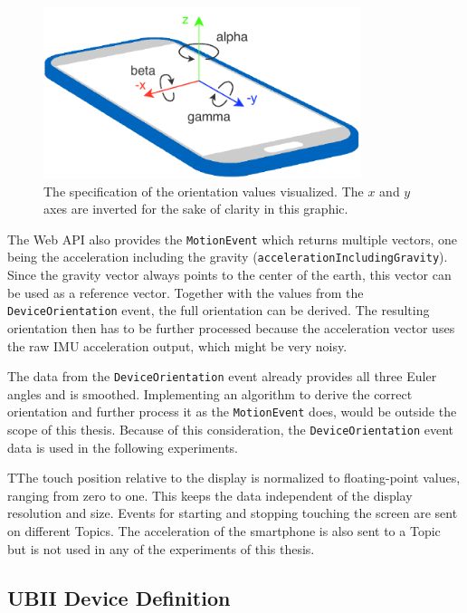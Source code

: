 \begin{figure}[H]
	\centering
	\includegraphics[height=5cm]{figures/implementation/webapi_device_orientation.pdf}
	\caption[Device coordinate system and orientation values]{The specification of the orientation values visualized. The \(x\) and \(y\) axes are inverted for the sake of clarity in this graphic.}\label{fig:webapi-device-orientation}
\end{figure}

The Web \ac{API} also provides the \lstinline{MotionEvent} which returns multiple vectors, one being the acceleration including the gravity (\lstinline{accelerationIncludingGravity}). Since the gravity vector always points to the center of the earth, this vector can be used as a reference vector. Together with the values from the \lstinline{DeviceOrientation} event, the full orientation can be derived. The resulting orientation then has to be further processed because the acceleration vector uses the raw \ac{IMU} acceleration output, which might be very noisy.

The data from the \lstinline{DeviceOrientation} event already provides all three Euler angles and is smoothed. Implementing an algorithm to derive the correct orientation and further process it as the \lstinline{MotionEvent} does, would be outside the scope of this thesis. Because of this consideration, the \lstinline{DeviceOrientation} event data is used in the following experiments.

TThe touch position relative to the display is normalized to floating-point values,  ranging from zero to one. This keeps the data independent of the display resolution and size. Events for starting and stopping touching the screen are sent on different Topics. The acceleration of the smartphone is also sent to a Topic but is not used in any of the experiments of this thesis.


\subsection{UBII Device Definition}\label{subsection:ubii-device-definition}

